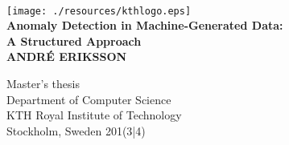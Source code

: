 \begin{titlepage}
\begin{center}

\quad\\[1.4cm]
\texttt{[image: ./resources/kthlogo.eps]}~\\[2.5cm]

{ \LARGE \bfseries Anomaly Detection in Machine-Generated Data:\\A Structured Approach}\\[3.0cm]

{\large \bfseries ANDRÉ ERIKSSON}\\[1.8cm]

\vfill

{ Master's thesis\\Department of Computer Science\\ KTH Royal Institute of Technology\\ Stockholm, Sweden 201(3|4)}

\end{center}
\end{titlepage}
